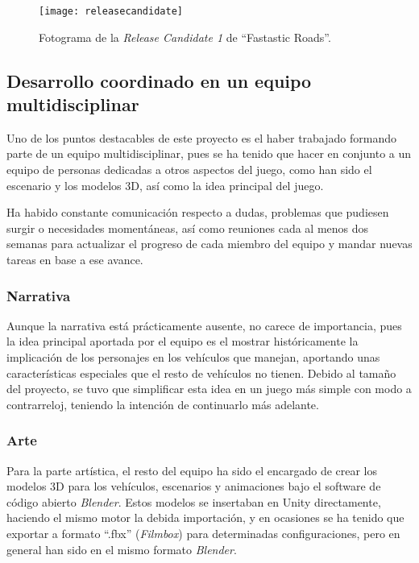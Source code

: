 \begin{figure}[h]
	\centering
	\texttt{[image: releasecandidate]}
	\caption{Fotograma de la \textit{Release Candidate 1} de ``Fastastic Roads''.}
	\label{fig:releasecandidate}
\end{figure}

\subsection{Desarrollo coordinado en un equipo multidisciplinar}

Uno de los puntos destacables de este proyecto es el haber trabajado formando parte de un equipo multidisciplinar, pues se ha tenido que hacer en conjunto a un equipo de personas dedicadas a otros aspectos del juego, como han sido el escenario y los modelos 3D, así como la idea principal del juego.

Ha habido constante comunicación respecto a dudas, problemas que pudiesen surgir o necesidades momentáneas, así como reuniones cada al menos dos semanas para actualizar el progreso de cada miembro del equipo y mandar nuevas tareas en base a ese avance.

\subsubsection{Narrativa}

Aunque la narrativa está prácticamente ausente, no carece de importancia, pues la idea principal aportada por el equipo es el mostrar históricamente la implicación de los personajes en los vehículos que manejan, aportando unas características especiales que el resto de vehículos no tienen. Debido al tamaño del proyecto, se tuvo que simplificar esta idea en un juego más simple con modo a contrarreloj, teniendo la intención de continuarlo más adelante.

\subsubsection{Arte}

Para la parte artística, el resto del equipo ha sido el encargado de crear los modelos 3D para los vehículos, escenarios y animaciones bajo el software de código abierto \textit{Blender}. Estos modelos se insertaban en Unity directamente, haciendo el mismo motor la debida importación, y en ocasiones se ha tenido que exportar a formato ``.fbx'' (\textit{Filmbox}) para determinadas configuraciones, pero en general han sido en el mismo formato \textit{Blender}.


